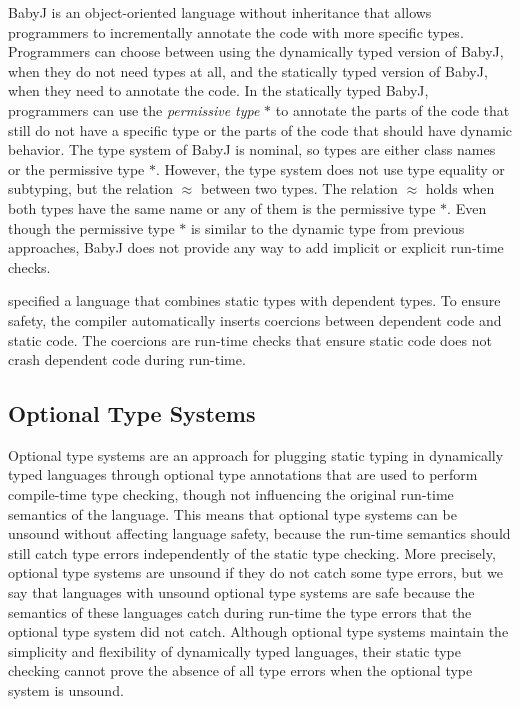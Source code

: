 \documentclass[preprint]{sig-alternate}
\begin{document}
BabyJ \citep{anderson2002babyj} is an object-oriented language
without inheritance that allows programmers to incrementally annotate
the code with more specific types.
Programmers can choose between using the dynamically typed version
of BabyJ, when they do not need types at all, and the statically
typed version of BabyJ, when they need to annotate the code.
In the statically typed BabyJ, programmers can use the
\textit{permissive type} $*$ to annotate the parts of the code that
still do not have a specific type or the parts of the code that should
have dynamic behavior.
The type system of BabyJ is nominal, so types are either class names
or the permissive type $*$.
However, the type system does not use type equality or subtyping,
but the relation $\approx$ between two types.
The relation $\approx$ holds when both types have the same name or
any of them is the permissive type $*$.
Even though the permissive type $*$ is similar to the dynamic type
from previous approaches, BabyJ does not provide any way to add
implicit or explicit run-time checks.

\citet{ou2004dtd} specified a language that combines static types
with dependent types.
To ensure safety, the compiler automatically inserts coercions
between dependent code and static code.
The coercions are run-time checks that ensure static code does not
crash dependent code during run-time.

\subsection{Optional Type Systems}

Optional type systems \citep{bracha2004pluggable} are an approach for
plugging static typing in dynamically typed languages through
optional type annotations that are used to perform compile-time type
checking, though not influencing the original run-time semantics of
the language.
This means that optional type systems can be unsound without affecting
language safety, because the run-time semantics should still catch
type errors independently of the static type checking.
More precisely, optional type systems are unsound if they do not catch
some type errors, but we say that languages with unsound optional type
systems are safe because the semantics of these languages catch during
run-time the type errors that the optional type system did not catch.
Although optional type systems maintain the simplicity and
flexibility of dynamically typed languages, their static type
checking cannot prove the absence of all type errors when the optional
type system is unsound.
\end{document}
